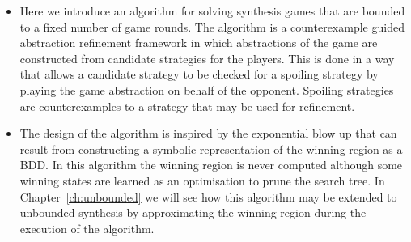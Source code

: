 \begin{itemize}
    \item Here we introduce an algorithm for solving synthesis games that are bounded to a fixed number of game rounds. The algorithm is a counterexample guided abstraction refinement framework in which abstractions of the game are constructed from candidate strategies for the players. This is done in a way that allows a candidate strategy to be checked for a spoiling strategy by playing the game abstraction on behalf of the opponent. Spoiling strategies are counterexamples to a strategy that may be used for refinement.

    \item The design of the algorithm is inspired by the exponential blow up that can result from constructing a symbolic representation of the winning region as a BDD. In this algorithm the winning region is never computed although some winning states are learned as an optimisation to prune the search tree. In Chapter~\ref{ch:unbounded} we will see how this algorithm may be extended to unbounded synthesis by approximating the winning region during the execution of the algorithm.

\end{itemize}




